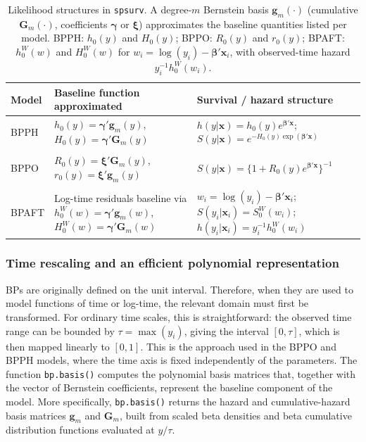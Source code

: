 \documentclass[5p,lefttitle]{elsarticle}
\begin{document}
{\begin{table}[!h]
\footnotesize
\centering
\caption{Likelihood structures in \texttt{spsurv}. A degree-$m$ Bernstein basis $\boldsymbol{g}_m(\cdot)$ (cumulative $\boldsymbol{G}_m(\cdot)$, coefficients $\boldsymbol{\gamma}$ or $\boldsymbol{\xi}$) approximates the baseline quantities listed per model. BPPH: $h_0(y)$ and $H_0(y)$; BPPO: $R_0(y)$ and $r_0(y)$; BPAFT: $h_0^W(w)$ and $H_0^W(w)$ for $w_i=\log(y_i)-\boldsymbol{\beta}'\boldsymbol{x}_i$, with observed-time hazard $y_i^{-1}h_0^W(w_i)$.}
\begin{tabularx}{\columnwidth}{%
>{\raggedright\arraybackslash}p{}
>{\raggedright\arraybackslash}p{}
>{\raggedright\arraybackslash}X}
\toprule
Model & Baseline function approximated & Survival / hazard structure \\
\midrule
BPPH
&
\(h_0(y)=\boldsymbol{\gamma}'\boldsymbol g_m(y)\),
\(H_0(y)=\boldsymbol{\gamma}'\boldsymbol G_m(y)\)
&
\(h(y\vert\boldsymbol x)=h_0(y)e^{\boldsymbol\beta'\boldsymbol x}\);
\(S(y\vert\boldsymbol x)=e^{-H_0(y)\exp(\boldsymbol\beta'\boldsymbol x)}\)
\\[0.8em]
& & \\
BPPO
&
\(R_0(y)=\boldsymbol{\xi}'\boldsymbol G_m(y)\),
\(r_0(y)=\boldsymbol{\xi}'\boldsymbol g_m(y)\)
&
\(S(y\vert\boldsymbol x)=\{1+R_0(y)e^{\boldsymbol\beta'\boldsymbol x}\}^{-1}\)
\\[0.8em]
& & \\
BPAFT
&
Log-time residuals baseline via
\(h^{W}_0(w)=\boldsymbol{\gamma}'\boldsymbol g_m(w)\),
\(H^{W}_0(w)=\boldsymbol{\gamma}'\boldsymbol G_m(w)\)
&
\(w_i=\log(y_i)-\boldsymbol\beta'\boldsymbol x_i\);
\(S(y_i\vert\boldsymbol x_i)=S_0^{W}(w_i)\);
\(h(y_i\vert\boldsymbol x_i)=y_i^{-1}h_0^{W}(w_i)\)
\\
\bottomrule
\end{tabularx}\label{tab:models}
\end{table}

\subsubsection{Time rescaling and an efficient polynomial representation}\label{sec:bp-domain}

BPs are originally defined on the unit interval. Therefore, when they
are used to model functions of time or log-time, the relevant domain
must first be transformed. For ordinary time scales, this is
straightforward: the observed time range can be bounded by
\(\tau=\max(y_i)\), giving the interval \([0,\tau]\), which is then mapped
linearly to \([0,1]\). This is the approach used in the BPPO and BPPH
models, where the time axis is fixed independently of the parameters.
The function \texttt{bp.basis()} computes the polynomial basis matrices
that, together with the vector of Bernstein coefficients, represent the
baseline component of the model. More specifically, \texttt{bp.basis()}
returns the hazard and cumulative-hazard basis matrices
\(\boldsymbol{g}_m\) and \(\boldsymbol{G}_m\), built from scaled beta
densities and beta cumulative distribution functions evaluated at
\(y/\tau\).

}
\end{document}
